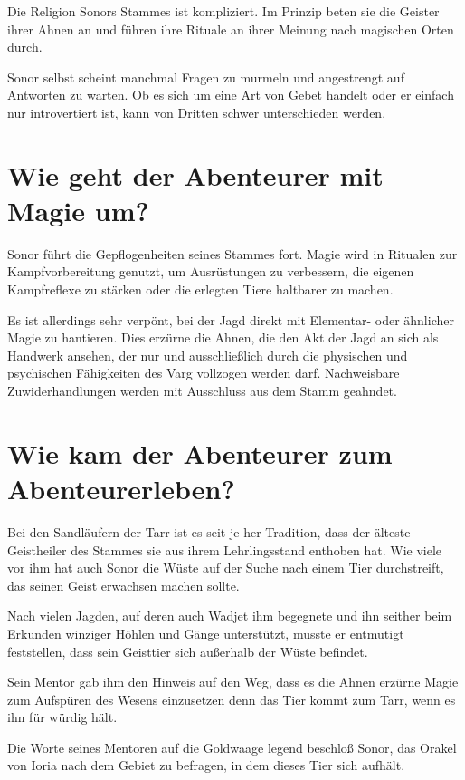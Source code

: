 \documentclass{article}
\begin{document}
	Die Religion Sonors Stammes ist kompliziert. Im Prinzip beten sie die
	Geister ihrer Ahnen an und führen ihre Rituale an ihrer Meinung nach magischen
	Orten durch.

	Sonor selbst scheint manchmal Fragen zu murmeln und angestrengt auf
	Antworten zu warten. Ob es sich um eine Art von Gebet handelt oder er einfach nur
	introvertiert ist, kann von Dritten schwer unterschieden werden.


	\section[Magie]{Wie geht der Abenteurer mit Magie um?}

	Sonor führt die Gepflogenheiten seines Stammes fort. Magie wird in
	Ritualen zur Kampfvorbereitung genutzt, um Ausrüstungen zu verbessern,
	die eigenen Kampfreflexe zu stärken oder die erlegten Tiere haltbarer zu
	machen.

	Es ist allerdings sehr verpönt, bei der Jagd direkt mit Elementar- oder
	ähnlicher Magie zu hantieren. Dies erzürne die Ahnen, die den Akt der Jagd an
	sich als Handwerk ansehen, der nur und ausschließlich durch die
	physischen und psychischen Fähigkeiten des Varg vollzogen werden darf.
	Nachweisbare Zuwiderhandlungen werden mit Ausschluss aus dem Stamm geahndet.


	\section[Schicksal]{Wie kam der Abenteurer zum Abenteurerleben?}

	Bei den Sandläufern der Tarr ist es seit je her Tradition, dass der
	älteste Geistheiler des Stammes sie aus ihrem Lehrlingsstand enthoben
	hat. Wie viele vor ihm hat auch Sonor die Wüste auf der Suche nach einem Tier
	durchstreift, das seinen Geist erwachsen machen sollte. 

	Nach vielen Jagden, auf deren auch Wadjet ihm begegnete und ihn seither
	beim Erkunden winziger Höhlen und Gänge unterstützt, musste er entmutigt
	feststellen, dass sein Geisttier sich außerhalb der Wüste befindet.

	Sein Mentor gab ihm den Hinweis auf den Weg, dass es die Ahnen erzürne
	Magie zum Aufspüren des Wesens einzusetzen denn das Tier kommt zum Tarr,
	wenn es ihn für würdig hält.

	Die Worte seines Mentoren auf die Goldwaage legend beschloß Sonor, das
	Orakel von Ioria nach dem Gebiet zu befragen, in dem dieses Tier sich
	aufhält.
\end{document}
